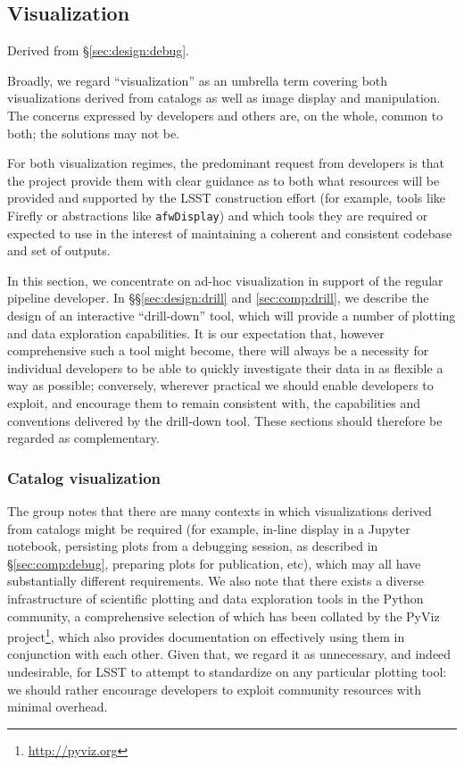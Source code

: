\subsection{Visualization}
\label{sec:comp:vis}

Derived from \S\ref{sec:design:debug}.

Broadly, we regard ``visualization'' as an umbrella term covering both visualizations derived from catalogs as well as image display and manipulation.
The concerns expressed by developers and others are, on the whole, common to both; the solutions may not be.

For both visualization regimes, the predominant request from developers is that the project provide them with clear guidance as to both what resources will be provided and supported by the LSST construction effort (for example, tools like Firefly or abstractions like \texttt{afwDisplay}) and which tools they are required or expected to use in the interest of maintaining a coherent and consistent codebase and set of outputs.

In this section, we concentrate on ad-hoc visualization in support of the regular pipeline developer.
In \S\S\ref{sec:design:drill} and \ref{sec:comp:drill}, we describe the design of an interactive ``drill-down'' tool, which will provide a number of plotting and data exploration capabilities.
It is our expectation that, however comprehensive such a tool might become, there will always be a necessity for individual developers to be able to quickly investigate their data in as flexible a way as possible; conversely, wherever practical we should enable developers to exploit, and encourage them to remain consistent with, the capabilities and conventions delivered by the drill-down tool.
These sections should therefore be regarded as complementary.

\subsubsection{Catalog visualization}
\label{sec:comp:vis:catalog}

The group notes that there are many contexts in which visualizations derived from catalogs might be required (for example, in-line display in a Jupyter notebook, persisting plots from a debugging session, as described in \S\ref{sec:comp:debug}, preparing plots for publication, etc), which may all have substantially different requirements.
We also note that there exists a diverse infrastructure of scientific plotting and data exploration tools in the Python community, a comprehensive selection of which has been collated by the PyViz project\footnote{\url{http://pyviz.org}}, which also provides documentation on effectively using them in conjunction with each other.
Given that, we regard it as unnecessary, and indeed undesirable, for LSST to attempt to standardize on any particular plotting tool: we should rather encourage developers to exploit community resources with minimal overhead.

